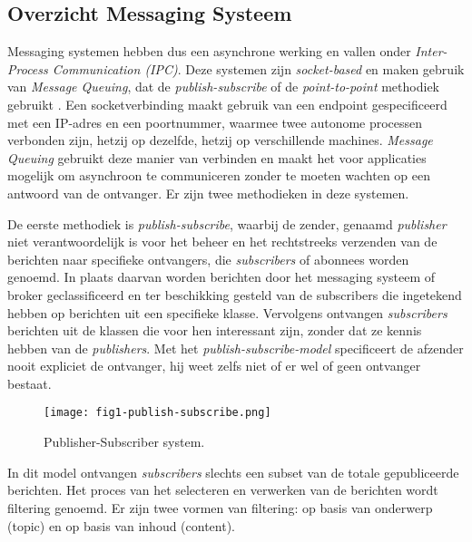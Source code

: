 \subsection{Overzicht Messaging Systeem}
Messaging systemen hebben dus een asynchrone werking en vallen onder \newline \emph{Inter-Process Communication (IPC)}. 
Deze systemen zijn \emph{socket-based} en maken gebruik van \emph{Message Queuing}, dat de \emph{publish-subscribe} of de \emph{point-to-point} methodiek gebruikt \autocite{Dinari2020}. 
\newline
Een socketverbinding maakt gebruik van een endpoint gespecificeerd met een IP-adres en een \newline poortnummer, 
waarmee twee autonome processen verbonden zijn, hetzij op dezelfde, hetzij op verschillende machines.
\newline
\emph{Message Queuing} gebruikt deze manier van verbinden en maakt het voor applicaties mogelijk om asynchroon 
te communiceren zonder te moeten wachten op een antwoord van de ontvanger. 
Er zijn twee methodieken in deze systemen. 
\newline
\newline

De eerste methodiek is \emph{publish-subscribe}, waarbij de zender, genaamd \emph{publisher} niet verantwoordelijk is voor het beheer 
en het rechtstreeks verzenden van de berichten naar specifieke ontvangers, die \emph{subscribers} of abonnees worden genoemd. 
In plaats daarvan worden berichten door het messaging systeem of broker geclassificeerd en ter 
beschikking gesteld van de subscribers die ingetekend hebben op berichten uit een specifieke klasse.
Vervolgens ontvangen \emph{subscribers} berichten uit de klassen die voor hen interessant zijn, zonder dat ze kennis hebben van de \emph{publishers}.
Met het \emph{publish-subscribe-model} specificeert de afzender nooit expliciet de ontvanger,
hij weet zelfs niet of er wel of geen ontvanger bestaat.
\newline

\begin{figure}[h]
  \centering
  \texttt{[image: fig1-publish-subscribe.png]}
  \caption{\label{fig:img}Publisher-Subscriber system\autocite{Sharvari2019}.}
\end{figure}

In dit model ontvangen \emph{subscribers} slechts een subset van de totale gepubliceerde berichten. 
Het proces van het selecteren en verwerken van de berichten wordt filtering genoemd. 
Er zijn twee vormen van filtering: op basis van onderwerp (topic) en op basis van inhoud (content).
\newline

